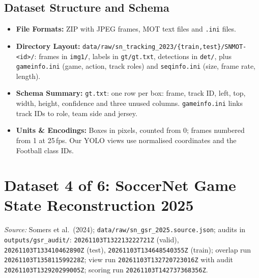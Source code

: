 \documentclass[11pt, a4paper]{article}
\newif\ifreportednoted
\newcommand{\resetreported}{\global\reportednotedfalse}
\begin{document}
\subsection{Dataset Structure and Schema}
\begin{itemize}
    \item \textbf{File Formats:} ZIP with JPEG frames, MOT text files and \texttt{.ini} files.
    \item \textbf{Directory Layout:} \texttt{data/raw/sn\_tracking\_2023/\{train,test\}/SNMOT-<id>/}: frames in \texttt{img1/}, labels in \texttt{gt/gt.txt}, detections in \texttt{det/}, plus \texttt{gameinfo.ini} (game, action, track roles) and \texttt{seqinfo.ini} (size, frame rate, length).
    \item \textbf{Schema Summary:} \texttt{gt.txt}: one row per box: frame, track ID, left, top, width, height, confidence and three unused columns. \texttt{gameinfo.ini} links track IDs to role, team side and jersey.
    \item \textbf{Units \& Encodings:} Boxes in pixels, counted from 0; frames numbered from 1 at 25\,fps. Our YOLO views use normalised coordinates and the Football class IDs.
\end{itemize}

\section{Dataset 4 of 6: SoccerNet Game State Reconstruction 2025}
\resetreported

\begin{sloppypar}\noindent\textit{Source:} Somers et al.\ (2024); \texttt{data/raw/}\allowbreak\texttt{sn\_gsr\_2025.source.json}; audits in \texttt{outputs/gsr\_audit/}: \texttt{20261103T132213222721Z} (valid), \texttt{20261103T133410462890Z} (test), \texttt{20261103T134648540355Z} (train); overlap run \texttt{20261103T135811599228Z}; view run \texttt{20261103T132720723016Z} with audit \texttt{20261103T132920299005Z}; scoring run \texttt{20261103T142737368356Z}.\end{sloppypar}
\end{document}
